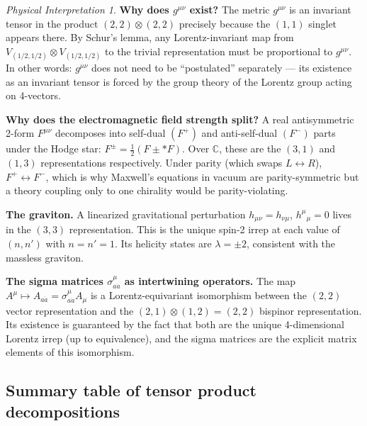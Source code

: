 \documentclass[12pt]{article}
\theoremstyle{remark}
\newtheorem*{physinterp}{Physical Interpretation}
\begin{document}
\begin{physinterp}
  \textbf{Why does $g^{\mu\nu}$ exist?}
  The metric $g^{\mu\nu}$ is an invariant tensor in the product
  $(2,2)\otimes(2,2)$ precisely because the $(1,1)$ singlet appears there.
  By Schur's lemma, any Lorentz-invariant map from $V_{(1/2,1/2)}\otimes V_{(1/2,1/2)}$
  to the trivial representation must be proportional to $g^{\mu\nu}$.
  In other words: $g^{\mu\nu}$ does not need to be ``postulated'' separately ---
  its existence as an invariant tensor is forced by the group theory of the Lorentz
  group acting on 4-vectors.

  \textbf{Why does the electromagnetic field strength split?}
  A real antisymmetric 2-form $F^{\mu\nu}$ decomposes into self-dual $(F^+)$ and
  anti-self-dual $(F^-)$ parts under the Hodge star: $F^{\pm} = \tfrac{1}{2}(F \pm {*F})$.
  Over $\mathbb{C}$, these are the $(3,1)$ and $(1,3)$ representations respectively.
  Under parity (which swaps $L\leftrightarrow R$), $F^+ \leftrightarrow F^-$,
  which is why Maxwell's equations in vacuum are parity-symmetric but a theory
  coupling only to one chirality would be parity-violating.

  \textbf{The graviton.}
  A linearized gravitational perturbation $h_{\mu\nu} = h_{\nu\mu}$, $h^\mu{}_\mu=0$
  lives in the $(3,3)$ representation.  This is the unique spin-2 irrep at each
  value of $(n,n')$ with $n=n'=1$.  Its helicity states are $\lambda = \pm 2$,
  consistent with the massless graviton.

  \textbf{The sigma matrices $\sigma^\mu_{a\dot{a}}$ as intertwining operators.}
  The map $A^\mu \mapsto A_{a\dot{a}} = \sigma^\mu_{a\dot{a}}A_\mu$ is a
  Lorentz-equivariant isomorphism between the $(2,2)$ vector representation and
  the $(2,1)\otimes(1,2) = (2,2)$ bispinor representation.
  Its existence is guaranteed by the fact that both are the unique 4-dimensional
  Lorentz irrep (up to equivalence), and the sigma matrices are the explicit
  matrix elements of this isomorphism.
\end{physinterp}

\subsection{Summary table of tensor product decompositions}
\end{document}
